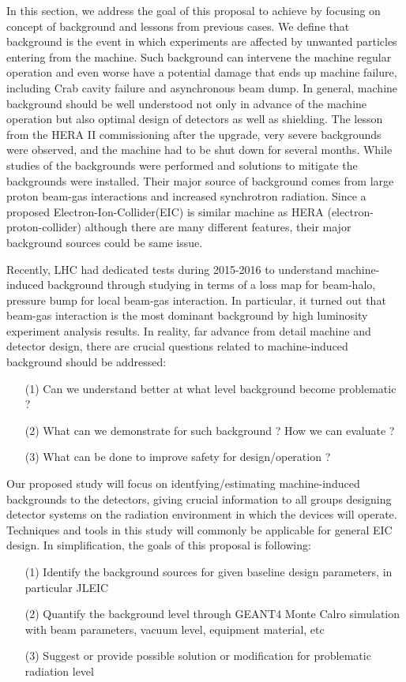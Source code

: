 
In this section, we address the goal of this proposal to achieve by focusing on concept of background and lessons from
previous cases.
We define that background is the event in which experiments are affected by unwanted particles entering from the machine.
Such background can intervene the machine regular operation and even worse have a potential damage that ends up machine
failure, including Crab cavity failure and asynchronous beam dump.
In general, machine background should be well understood not only in advance of the machine operation but also optimal
design of detectors as well as shielding. The lesson from the HERA II commissioning after the upgrade, very severe
backgrounds were observed, and the machine had to be shut down for several months. While studies of the backgrounds
were performed and solutions to mitigate the backgrounds were installed. Their major source of background comes from
large proton beam-gas interactions and increased synchrotron radiation. Since a proposed Electron-Ion-Collider(EIC)
is similar machine as HERA (electron-proton-collider) although there are many different features, their major background
sources could be same issue.


Recently, LHC had dedicated tests during 2015-2016 to understand machine-induced background through studying in terms of
a loss map for beam-halo, pressure bump for local beam-gas interaction. In particular, it turned out that beam-gas interaction
is the most dominant background by high luminosity experiment analysis results.
In reality, far advance from detail machine and detector design, there are crucial questions related to machine-induced background
should be addressed:
\begin{itemize}
\item[(1)] Can we understand better at what level background become problematic ?
\item[(2)] What can we demonstrate for such background ? How we can evaluate ?
\item[(3)] What can be done to improve safety for design/operation ?
\end{itemize}


Our proposed study will focus on identfying/estimating machine-induced backgrounds to the detectors, giving crucial information
to all groups designing detector systems on the radiation environment in which the devices will operate. Techniques and tools in this study
will commonly be applicable for general EIC design.
In simplification, the goals of this proposal is following:
\begin{itemize}
\item[(1)] Identify the background sources for given baseline design parameters, in particular JLEIC
\item[(2)] Quantify the background level through GEANT4 Monte Calro simulation with beam parameters, vacuum level, equipment material, etc
\item[(3)] Suggest or provide possible solution or modification for problematic radiation level
\end{itemize}

